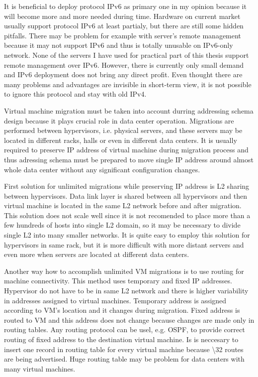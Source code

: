 It is beneficial to deploy protocol \Ac{IPv6} as primary one in my opinion because it will become more and more needed during time. Hardware on current market usually support protocol \Ac{IPv6} at least partialy, but there are still some hidden pitfalls. There may be problem for example with server's remote management because it may not support \Ac{IPv6} and thus is totally unusable on \Ac{IPv6}-only network. None of the servers I have used for practical part of this thesis support remote management over \Ac{IPv6}. 
However, there is currently only small demand and \Ac{IPv6} deployment does not bring any direct profit. Even thought there are many problems and advantages are invisible in short-term view, it is not possible to ignore this protocol and stay with old \Ac{IPv4}.

Virtual machine migration must be taken into account durring addressing schema design because it plays crucial role in data center operation. Migrations are performed between hypervisors, i.e. physical servers, and these servers may be located in different racks, halls or even in different data centers. It is usually required to preserve \Ac{IP} address of virtual machine during migration process and thus adressing schema must be prepared to move single \Ac{IP} address around almost whole data center without any significant configuration changes. 

First solution for unlimited migrations while preserving \Ac{IP} address is L2 sharing between hypervisors. Data link layer is shared between all hypervisors and then virtual machine is located in the same L2 network before and after migration. This solution does not scale well since it is not recomended to place more than a few hundreds of hosts into single L2 domain, so it may be necessary to divide single L2 into many smaller networks. It is quite easy to employ this solution for hypervisors in same rack, but it is more difficult with more distant servers and even more when servers are located at different data centers.

Another way how to accomplish unlimited \Ac{VM} migrations is to use routing for machine connectivity. This method uses temporary and fixed \Ac{IP} addresses. Hypervisor do not have to be in same L2 network and there is higher variability in addresses assigned to virtual machines. Temporary address is assigned according to \Ac{VM}'s location and it changes during migration. Fixed address is routed to \Ac{VM} and this address does not change because changes are made only in routing tables. Any routing protocol can be usel, e.g. \Ac{OSPF}, to provide correct routing of fixed address to the destination virtual machine. Is is neccesary to insert one record in routing table for every virtual machine because \textbackslash 32 routes are being advertised. Huge routing table may be problem for data centers with many virtual machines.

